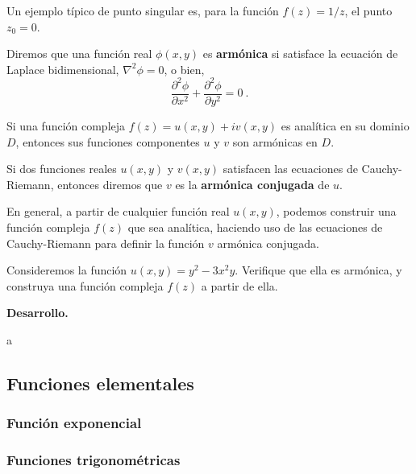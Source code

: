Un ejemplo típico de punto singular es, para la función $f(z) = 1/z$, el punto $z_0 = 0$.

\begin{defi}
    Diremos que una función real $\phi(x,y)$ es \textbf{armónica} si satisface la ecuación de Laplace bidimensional, $\nabla^2 \phi = 0$, o bien,
    \begin{equation}
        \frac{\partial^2 \phi}{\partial x^2} + \frac{\partial^2 \phi}{\partial y^2} = 0 \ .
    \end{equation}
\end{defi}

\begin{teorema}
    Si una función compleja $f(z) = u(x,y) + i v(x,y)$ es analítica en su dominio $D$, entonces sus funciones componentes $u$ y $v$ son armónicas en $D$.
\end{teorema}

\begin{defi}
    Si dos funciones reales $u(x,y)$ y $v(x,y)$ satisfacen las ecuaciones de Cauchy-Riemann, entonces diremos que $v$ es la \textbf{armónica conjugada} de $u$.
\end{defi}

En general, a partir de cualquier función real $u(x,y)$, podemos construir una función compleja $f(z)$ que sea analítica, haciendo uso de las ecuaciones de Cauchy-Riemann para definir la función $v$ armónica conjugada.

\begin{ejemplo}
    Consideremos la función $u(x,y) = y^2 - 3x^2y$. Verifique que ella es armónica, y construya una función compleja $f(z)$ a partir de ella.

    \noindent \textbf{Desarrollo.}

    \noindent a
\end{ejemplo}

\subsection{Funciones elementales}

\subsubsection{Función exponencial}

\subsubsection{Funciones trigonométricas}

